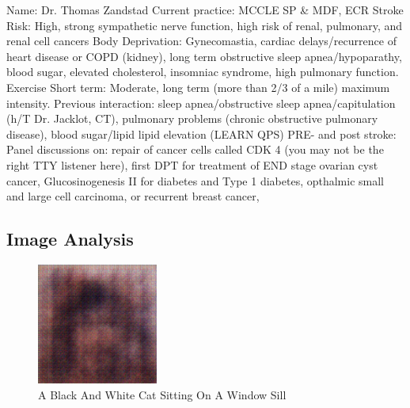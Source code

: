 \documentclass{article}%
\begin{document}
Name: Dr. Thomas Zandstad\newline%
Current practice: MCCLE SP \& MDF, ECR\newline%
Stroke Risk: High, strong sympathetic nerve function, high risk of renal, pulmonary, and renal cell cancers\newline%
Body Deprivation: Gynecomastia, cardiac delays/recurrence of heart disease or COPD (kidney), long term obstructive sleep apnea/hypoparathy, blood sugar, elevated cholesterol, insomniac syndrome, high pulmonary function.\newline%
Exercise Short term: Moderate, long term (more than 2/3 of a mile) maximum intensity.\newline%
Previous interaction: sleep apnea/obstructive sleep apnea/capitulation (h/T Dr. Jacklot, CT), pulmonary problems (chronic obstructive pulmonary disease), blood sugar/lipid lipid elevation (LEARN QPS)\newline%
PRE{-} and post stroke: Panel discussions on: repair of cancer cells called CDK 4 (you may not be the right TTY listener here), first DPT for treatment of END stage ovarian cyst cancer, Glucosinogenesis II for diabetes and Type 1 diabetes, opthalmic small and large cell carcinoma, or recurrent breast cancer,

%
\subsection{Image Analysis}%
\label{subsec:ImageAnalysis}%


\begin{figure}[h!]%
\centering%
\includegraphics[width=150px]{500_fake_images/samples_5_185.png}%
\caption{A Black And White Cat Sitting On A Window Sill}%
\end{figure}

%
\end{document}
